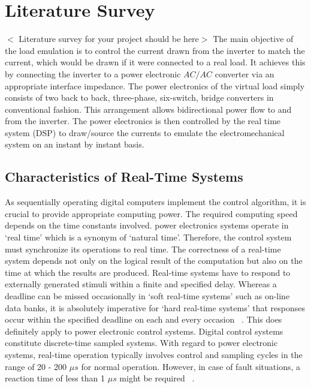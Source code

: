 \chapter{Literature Survey}
$<$ Literature survey for your project should be here$>$\newline
The main objective of the load emulation is to control the
current drawn from the inverter to match the current,
which would be drawn if it were connected to a real
load. It achieves this by connecting the inverter to
a power electronic $AC/AC$ converter via an appropriate interface impedance. The power electronics of the virtual load
simply consists of two back to back, three-phase, six-switch, bridge converters in conventional fashion. This
arrangement allows bidirectional power flow to and
from the inverter. The power electronics is then controlled by the real time system (DSP) to draw/source the currents to emulate the electromechanical system on an instant by instant basis. 
\section{Characteristics of Real-Time Systems}
As sequentially operating digital computers implement the control algorithm, it is crucial to provide appropriate computing power. The required computing speed depends on the time constants involved. power electronics systems operate in `real time' which is a synonym of `natural time'. Therefore, the control system must synchronize its operations to real time. The correctness of a real-time system depends not only on the logical result of the computation but also on the time at which the results are produced. Real-time systems have to respond to externally generated stimuli within a finite and specified delay. Whereas a deadline can be missed occasionally in `soft real-time systems' such as on-line data banks, it is absolutely imperative for `hard real-time systems' that responses occur within the specified deadline on each and every occasion ~\cite{qing}. This does definitely apply to power electronic control systems. Digital control systems constitute discrete-time sampled systems. With regard to power electronic systems, real-time operation typically involves control and sampling cycles in the range of 20 - 200 $\mu s$ for normal operation. However, in case of fault situations, a reaction time of less than 1 $\mu s$ might be required ~\cite{mcc}.
